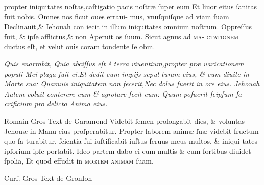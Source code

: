 \documentclass[]{article}
\begin{document}
\begin{multicols}{2}
	\begin{sloppypar}\noindent propter iniquitates noſtas,caſtigatio pacis noſtr\ae{} ſuper eum\newline
		Et liuor eitus ſanitas fuit nobis. Omnes nos ficut oues erraui-\newline
		mus, vnuſquiſque ad viam ſuam Declinauit,\& Iehouah con\newline
		iecit in illum iniquitates omnium noſtrum. Oppreſſus fuit,\newline
		\& ipſe afflictus,\& non Aperuit os ſuum. Sicut agnus ad \textsc{ma}-\newline
		\textsc{ctationem} ductus eſt, et velut ouis coram tondente ſe obm.\\
	\end{sloppypar}

	\columnbreak

	\justifying
	\noindent
	\textit{Quis enarrabit, Quia abciſſus eſt \`e terra viuentium,propter pr\ae{} \linebreak
		uaricationem populi Mei plaga fuit ei.Et dedit cum impijs sepul\linebreak
		turam eius, \& cum diuite in Morte sua: Quamuis iniquitatem\linebreak
		non fecerit,Nec dolus fuerit in ore eius. Jehouah Autem voluit\linebreak
		conterere eum \& agrotare fecit eum: Quum poſuerit ſeipſum ſa\linebreak
		crificium pro delicto Anima eius.}
\end{multicols}
\vspace{-3\baselineskip}
\begin{multicols}{2}
	\tiny
	\centering
	Romain Gros Text de Garamond\linebreak
	\small
	\qquad Videbit ſemen prolongabit dies, \& voluntas Jehou\ae{} in Manu eius\newline
	proſperabitur. Propter laborem anim\ae{} ſu\ae{} videbit fructum quo ſa\newline
	turabitur, ſcientia ſui iuſtificabit iuſtus ſeruus meus multos, \& iniqui\newline
	tates ipſorium ipſe portabit. Ideo partem dabo ei cum multis \& cum\newline
	fortibus diuidet ſpolia, Et quod effudit in \textsc{mortem animam} ſuam,


	\columnbreak
	\tiny
	\centering
	Curſ. Gros Text de GronIon

	\small
	\justifying
	\noindent
	\textit{}
\end{multicols}
\end{document}
